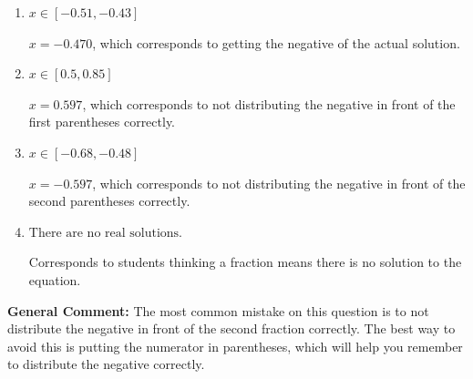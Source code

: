 \documentclass{extbook}[14pt]
\begin{document}
\begin{enumerate}
{\begin{enumerate}[label=\Alph*.]
* $x = -0.765$, which is the correct option.
\item \( x \in [-0.51, -0.43] \)

$x = -0.470$, which corresponds to getting the negative of the actual solution.
\item \( x \in [0.5, 0.85] \)

$x = 0.597$, which corresponds to not distributing the negative in front of the first parentheses correctly.
\item \( x \in [-0.68, -0.48] \)

$x = -0.597$, which corresponds to not distributing the negative in front of the second parentheses correctly.
\item \( \text{There are no real solutions.} \)

Corresponds to students thinking a fraction means there is no solution to the equation.
\end{enumerate}

\textbf{General Comment:} The most common mistake on this question is to not distribute the negative in front of the second fraction correctly. The best way to avoid this is putting the numerator in parentheses, which will help you remember to distribute the negative correctly.
}
\end{enumerate}
\end{document}
